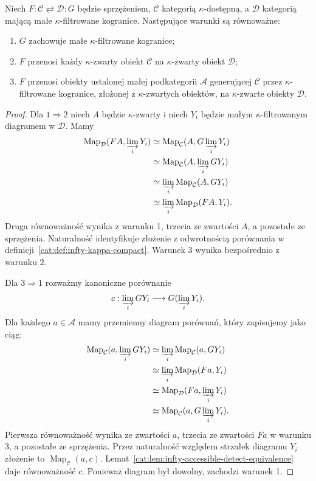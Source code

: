 \begin{stwierdzenie}\label{cat:prop:infty-adjoint-compact-transfer}
Niech $F:\mathcal C\rightleftarrows\mathcal D:G$ będzie sprzężeniem, $\mathcal C$ kategorią $\kappa$-dostępną, a $\mathcal D$ kategorią mającą małe $\kappa$-filtrowane kogranice. Następujące warunki są równoważne:
\begin{enumerate}
 \item $G$ zachowuje małe $\kappa$-filtrowane kogranice;
 \item $F$ przenosi każdy $\kappa$-zwarty obiekt $\mathcal C$ na $\kappa$-zwarty obiekt $\mathcal D$;
 \item $F$ przenosi obiekty ustalonej małej podkategorii $\mathcal A$ generującej $\mathcal C$ przez $\kappa$-filtrowane kogranice, złożonej z $\kappa$-zwartych obiektów, na $\kappa$-zwarte obiekty $\mathcal D$.
\end{enumerate}
\end{stwierdzenie}
\begin{proof}
Dla $1\Rightarrow2$ niech $A$ będzie $\kappa$-zwarty i niech $Y_i$ będzie małym $\kappa$-filtrowanym diagramem w $\mathcal D$. Mamy
\[
\begin{aligned}
 \operatorname{Map}_{\mathcal D}(FA,\varinjlim_iY_i)
 &\simeq \operatorname{Map}_{\mathcal C}(A,G\varinjlim_iY_i)\\
 &\simeq \operatorname{Map}_{\mathcal C}(A,\varinjlim_i GY_i)\\
 &\simeq \varinjlim_i\operatorname{Map}_{\mathcal C}(A,GY_i)\\
 &\simeq \varinjlim_i\operatorname{Map}_{\mathcal D}(FA,Y_i).
\end{aligned}
\]
Druga równoważność wynika z warunku 1, trzecia ze zwartości $A$, a pozostałe ze sprzężenia. Naturalność identyfikuje złożenie z odwrotnością porównania w definicji~\ref{cat:def:infty-kappa-compact}. Warunek 3 wynika bezpośrednio z warunku 2.

Dla $3\Rightarrow1$ rozważmy kanoniczne porównanie
\[
 c:\varinjlim_i GY_i\longrightarrow G(\varinjlim_iY_i).
\]
Dla każdego $a\in\mathcal A$ mamy przemienny diagram porównań, który zapisujemy jako ciąg:
\[
\begin{aligned}
 \operatorname{Map}_{\mathcal C}(a,\varinjlim_i GY_i)
 &\simeq\varinjlim_i\operatorname{Map}_{\mathcal C}(a,GY_i)\\
 &\simeq\varinjlim_i\operatorname{Map}_{\mathcal D}(Fa,Y_i)\\
 &\simeq\operatorname{Map}_{\mathcal D}(Fa,\varinjlim_i Y_i)\\
 &\simeq\operatorname{Map}_{\mathcal C}(a,G\varinjlim_i Y_i).
\end{aligned}
\]
Pierwsza równoważność wynika ze zwartości $a$, trzecia ze zwartości $Fa$ w warunku 3, a pozostałe ze sprzężenia. Przez naturalność względem strzałek diagramu $Y_i$ złożenie to $\operatorname{Map}_{\mathcal C}(a,c)$. Lemat~\ref{cat:lem:infty-accessible-detect-equivalence} daje równoważność $c$. Ponieważ diagram był dowolny, zachodzi warunek 1.
\end{proof}

